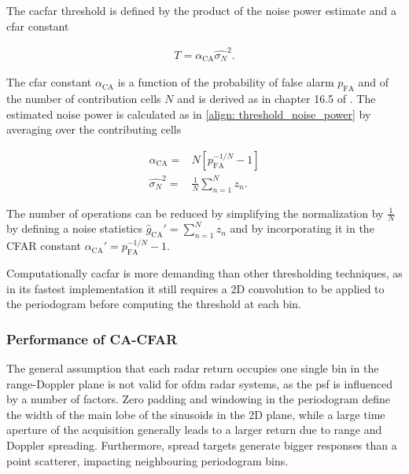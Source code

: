
The \gls{cacfar} threshold is defined by the product of the noise power estimate and a \gls{cfar} constant

\begin{align*}
	T = \alpha_{\text{CA}} \hat{\sigma_N}^2.
\end{align*}

The \gls{cfar} constant $\alpha_{\text{CA}}$ is a function of the probability of false alarm $p_{\text{FA}}$ and of the number of contribution cells $N$ and is derived as in chapter 16.5 of \cite{Richards_Scheer_Holm_2010}. The estimated noise power is calculated as in \ref{align: threshold_noise_power} by averaging over the contributing cells

\begin{align*}
	\alpha_{\text{CA}} =& N[p_{\text{FA}}^{-1/N} - 1] \\
	\hat{\sigma_N}^2 =& \frac{1}{N}\sum_{n=1}^N z_n.
\end{align*}

The number of operations can be reduced by simplifying the normalization by $\frac{1}{N}$ by defining a noise statistics $\hat{g}_{\text{CA}}' = \sum_{n=1}^N z_n$ and by incorporating it in the CFAR constant $\alpha_{\text{CA}}' = p_{\text{FA}}^{-1/N} - 1$.

Computationally \gls{cacfar} is more demanding than other thresholding techniques, as in its fastest implementation it still requires a 2D convolution to be applied to the periodogram before computing the threshold at each bin.

\subsubsection{Performance of CA-CFAR}

The general assumption that each radar return occupies one single bin in the range-Doppler plane is not valid for \gls{ofdm} radar systems, as the \gls{psf} is influenced by a number of factors.
Zero padding and windowing in the periodogram define the width of the main lobe of the sinusoids in the 2D plane, while a large time aperture of the acquisition generally leads to a larger return due to range and Doppler spreading.
Furthermore, spread targets generate bigger responses than a point scatterer, impacting neighbouring periodogram bins.


